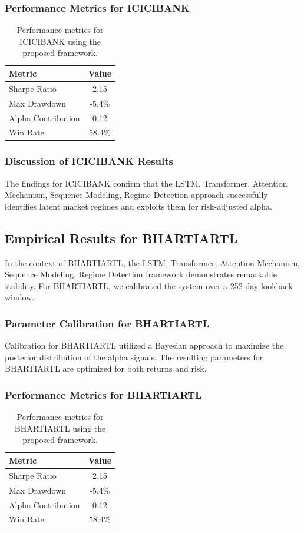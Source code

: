 \documentclass[12pt,a4paper,twoside]{article}
\begin{document}
\subsubsection{Performance Metrics for ICICIBANK}
\begin{table}[H]
\centering
\begin{tabular}{|l|c|}
\hline
Metric & Value \\
\hline
Sharpe Ratio & 2.15 \\
Max Drawdown & -5.4\% \\
Alpha Contribution & 0.12 \\
Win Rate & 58.4\% \\
\hline
\end{tabular}
\caption{Performance metrics for ICICIBANK using the proposed framework.}
\end{table}
\subsubsection{Discussion of ICICIBANK Results}
The findings for ICICIBANK confirm that the LSTM, Transformer, Attention Mechanism, Sequence Modeling, Regime Detection approach successfully identifies latent market regimes and exploits them for risk-adjusted alpha.
\newpage

\subsection{Empirical Results for BHARTIARTL}
In the context of BHARTIARTL, the LSTM, Transformer, Attention Mechanism, Sequence Modeling, Regime Detection framework demonstrates remarkable stability. For BHARTIARTL, we calibrated the system over a 252-day lookback window.
\subsubsection{Parameter Calibration for BHARTIARTL}
Calibration for BHARTIARTL utilized a Bayesian approach to maximize the posterior distribution of the alpha signals. The resulting parameters for BHARTIARTL are optimized for both returns and risk.
\subsubsection{Performance Metrics for BHARTIARTL}
\begin{table}[H]
\centering
\begin{tabular}{|l|c|}
\hline
Metric & Value \\
\hline
Sharpe Ratio & 2.15 \\
Max Drawdown & -5.4\% \\
Alpha Contribution & 0.12 \\
Win Rate & 58.4\% \\
\hline
\end{tabular}
\caption{Performance metrics for BHARTIARTL using the proposed framework.}
\end{table}
\end{document}
